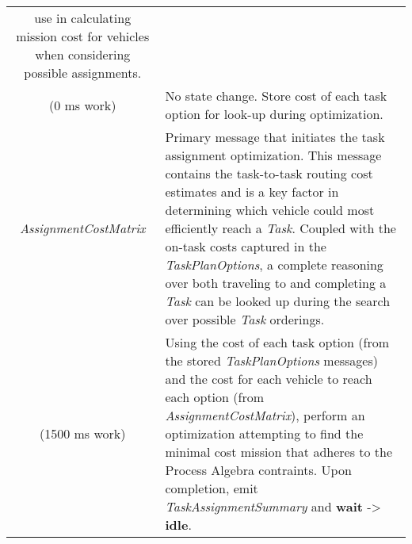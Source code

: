 \begin{longtable}[]{@{}cl@{}}
\begin{minipage}[t]{0.55\columnwidth}
use in calculating mission cost for vehicles when considering possible
assignments.\strut
\end{minipage}\tabularnewline
\begin{minipage}[t]{0.40\columnwidth}\centering\strut
(0 ms work)\strut
\end{minipage} & \begin{minipage}[t]{0.55\columnwidth}\raggedright\strut
No state change. Store cost of each task option for look-up during
optimization.\strut
\end{minipage}\tabularnewline
\begin{minipage}[t]{0.40\columnwidth}\centering\strut
\emph{AssignmentCostMatrix}\strut
\end{minipage} & \begin{minipage}[t]{0.55\columnwidth}\raggedright\strut
Primary message that initiates the task assignment optimization. This
message contains the task-to-task routing cost estimates and is a key
factor in determining which vehicle could most efficiently reach a
\emph{Task}. Coupled with the on-task costs captured in the
\emph{TaskPlanOptions}, a complete reasoning over both traveling to and
completing a \emph{Task} can be looked up during the search over
possible \emph{Task} orderings.\strut
\end{minipage}\tabularnewline
\begin{minipage}[t]{0.40\columnwidth}\centering\strut
(1500 ms work)\strut
\end{minipage} & \begin{minipage}[t]{0.55\columnwidth}\raggedright\strut
Using the cost of each task option (from the stored
\emph{TaskPlanOptions} messages) and the cost for each vehicle to reach
each option (from \emph{AssignmentCostMatrix}), perform an optimization
attempting to find the minimal cost mission that adheres to the Process
Algebra contraints. Upon completion, emit \emph{TaskAssignmentSummary}
and \textbf{wait} -\textgreater{} \textbf{idle}.\strut
\end{minipage}\tabularnewline
\bottomrule
\end{longtable}

